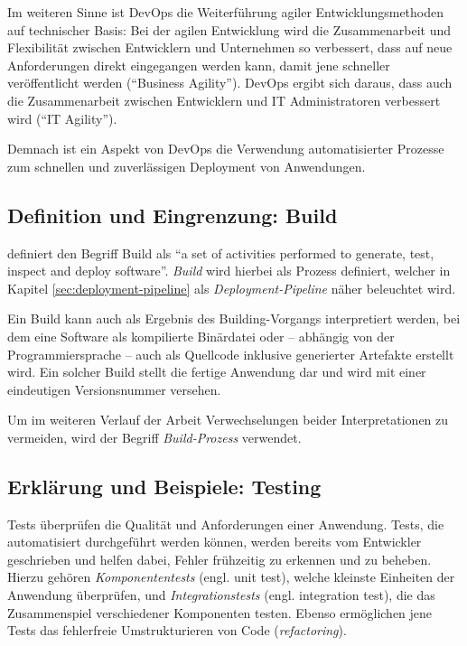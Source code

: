 Im weiteren Sinne ist DevOps die Weiterführung agiler Entwicklungsmethoden auf technischer Basis: Bei der agilen Entwicklung wird die Zusammenarbeit und Flexibilität zwischen Entwicklern und Unternehmen so verbessert, dass auf neue Anforderungen direkt eingegangen werden kann, damit jene schneller veröffentlicht werden (``Business Agility''). DevOps ergibt sich daraus, dass auch die Zusammenarbeit zwischen Entwicklern und IT Administratoren verbessert wird (``IT Agility''). \citep[4f]{Chapman2014}

Demnach ist ein Aspekt von DevOps die Verwendung automatisierter Prozesse zum schnellen und zuverlässigen Deployment von Anwendungen.

\subsection{Definition und Eingrenzung: Build}
\label{subsec:build}

\citet[27]{Duvall2007} definiert den Begriff Build als ``a set of activities performed to generate, test, inspect and deploy software''. \emph{Build} wird hierbei als Prozess definiert, welcher in Kapitel \ref{sec:deployment-pipeline} als \emph{Deployment-Pipeline} näher beleuchtet wird.

Ein Build kann auch als Ergebnis des Building-Vorgangs interpretiert werden, bei dem eine Software als kompilierte Binärdatei oder – abhängig von der Programmiersprache – auch als Quellcode inklusive generierter Artefakte erstellt wird. Ein solcher Build stellt die fertige Anwendung dar und wird mit einer eindeutigen Versionsnummer versehen.

Um im weiteren Verlauf der Arbeit Verwechselungen beider Interpretationen zu vermeiden, wird der Begriff \emph{Build-Prozess} verwendet.

\subsection{Erklärung und Beispiele: Testing}

Tests überprüfen die Qualität und Anforderungen einer Anwendung. Tests, die automatisiert durchgeführt werden können, werden bereits vom Entwickler geschrieben und helfen dabei, Fehler frühzeitig zu erkennen und zu beheben. Hierzu gehören \emph{Komponententests} (engl. unit test), welche kleinste Einheiten der Anwendung überprüfen, und \emph{Integrationstests} (engl. integration test), die das Zusammenspiel verschiedener Komponenten testen. Ebenso ermöglichen jene Tests das fehlerfreie Umstrukturieren von Code (\emph{refactoring}). \citep[104f]{Wolff2016}

